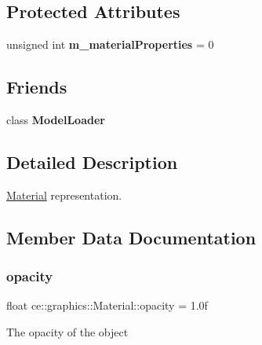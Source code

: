 \subsection*{Protected Attributes}
\begin{DoxyCompactItemize}
\item 
\mbox{\label{structce_1_1graphics_1_1_material_aff162e4070b34139c00cc149c70eb5f8}} 
unsigned int {\bfseries m\+\_\+material\+Properties} = 0
\end{DoxyCompactItemize}
\subsection*{Friends}
\begin{DoxyCompactItemize}
\item 
\mbox{\label{structce_1_1graphics_1_1_material_ac22dade55c1e8f81ea3e0892cd321190}} 
class {\bfseries Model\+Loader}
\end{DoxyCompactItemize}


\subsection{Detailed Description}
\hyperlink{structce_1_1graphics_1_1_material}{Material} representation. 

\subsection{Member Data Documentation}
\mbox{\label{structce_1_1graphics_1_1_material_ad6f3a5c250e374b47ca6bbefb75b8a6c}} 
\subsubsection{\texorpdfstring{opacity}{opacity}}
{\footnotesize\ttfamily float ce\+::graphics\+::\+Material\+::opacity = 1.\+0f}

The opacity of the object \mbox{\label{structce_1_1graphics_1_1_material_a3451761d37b0d7e42a0bd075b163aa8e}} 
